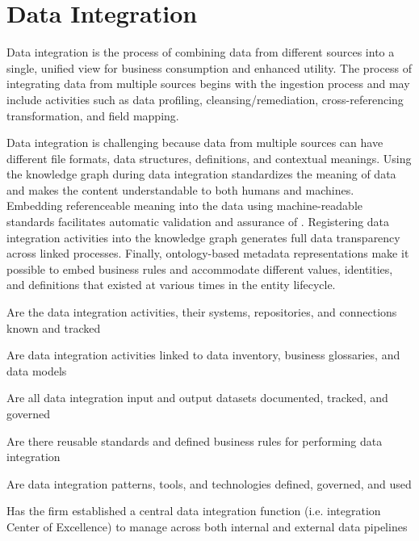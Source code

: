\section{Data Integration}\label{sec:ekgmm-b-2-5} %

Data integration is the process of combining data from different sources into a single, unified view for
business consumption and enhanced utility.
The process of integrating data from multiple sources begins with the ingestion process and may include activities
such as data profiling, cleansing/remediation, cross-referencing transformation, and field mapping.

\ekgmmContextSection

Data integration is challenging because data from multiple sources can have different file formats, data structures,
definitions, and contextual meanings.
Using the knowledge graph during data integration standardizes the meaning of data and makes the content understandable
to both humans and machines.
Embedding referenceable meaning into the data using machine-readable standards facilitates automatic validation and
assurance of .
Registering data integration activities into the knowledge graph generates full data transparency across
linked processes.
Finally, ontology-based metadata representations make it possible to embed business rules and accommodate
different values, identities, and definitions that existed at various times in the entity lifecycle.

\kgmmcorequestionssection

\begin{core-questions}

  \item [\thesection.1] Are the data integration activities, their systems, repositories, and connections
                        known and tracked
  \item [\thesection.2] Are data integration activities linked to data inventory, business glossaries, and data models
  \item [\thesection.3] Are all data integration input and output datasets documented, tracked, and governed
  \item [\thesection.4] Are there reusable standards and defined business rules for performing data integration
  \item [\thesection.5] Are data integration patterns, tools, and technologies defined, governed, and used
  \item [\thesection.6] Has the firm established a central data integration function
                        (i.e. integration Center of Excellence) to manage  across both
                        internal and external data pipelines
\end{core-questions}

